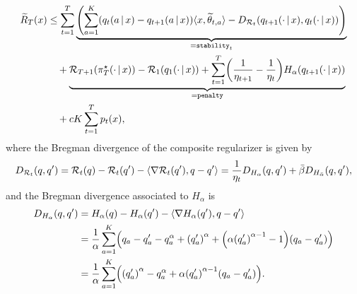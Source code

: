 \begin{align*}
    \wt R_T \spr*{x} &\leq \sumtT \underbrace{\spr*{\sumaK \spr*{q_t \spr*{a \given x} - q_{t+1} \spr*{a \given x}} \inp{x, \wt \theta_{t, a}} - D_{\cR_t} \spr*{q_{t+1} \spr*{\cdot \given x}, q_t \spr*{\cdot \given x}}}}_{= \stabt}\\
    &\quad+ \underbrace{\cR_{T+1} \spr*{\pi_T^\star \spr*{\cdot \given x}} - \cR_1 \spr*{q_1 \spr*{\cdot \given x}} + \sumtT \spr*{\frac{1}{\eta_{t+1}} - \frac{1}{\eta_t}} H_{\alpha} \spr*{q_{t+1} \spr*{\cdot \given x}}}_{= \pen}\\
    &\quad+ c K \sumtT p_t \spr*{x},
\end{align*}
%
where the Bregman divergence of the composite regularizer is given by
%
\begin{equation*}
    D_{\cR_t} \spr*{q, q'} = \cR_t \spr*{q} - \cR_t \spr*{q'} - \inp*{\nabla \cR_t \spr*{q'}, q - q'} = \frac{1}{\eta_t} D_{H_\alpha} \spr*{q, q'} + \bar\beta D_{H_{\bar\alpha}} \spr*{q, q'},
\end{equation*}
%
and the Bregman divergence associated to $H_\alpha$ is
%
\begin{align*}
    D_{H_\alpha} \spr*{q, q'} &= H_\alpha \spr*{q} - H_\alpha \spr*{q'} - \inp*{\nabla H_\alpha \spr*{q'}, q - q'}\\
    &= \frac{1}{\alpha} \sumaK \spr*{q_a - q_a' - q_a^\alpha + \spr*{q_a'}^\alpha + \spr*{\alpha \spr*{q_a'}^{\alpha - 1} - 1} \spr*{q_a - q_a'}}\\
    &= \frac{1}{\alpha} \sumaK \spr*{\spr*{q_a'}^\alpha - q_a^\alpha + \alpha \spr*{q_a'}^{\alpha - 1} \spr*{q_a - q_a'}}.
\end{align*}

